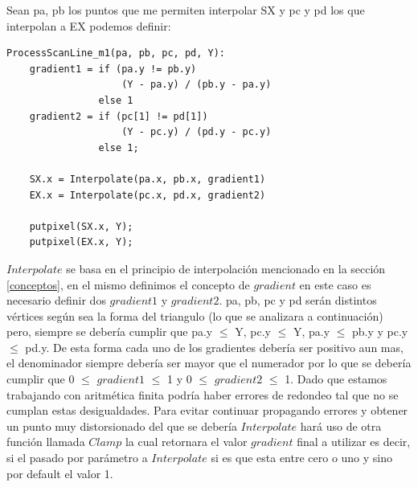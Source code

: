 \documentclass[a4paper]{article}
\begin{document}
\par Sean pa, pb los puntos que me permiten interpolar SX y pc y pd los que interpolan a EX podemos definir: 
\begin{verbatim}
ProcessScanLine_m1(pa, pb, pc, pd, Y):
    gradient1 = if (pa.y != pb.y) 
                    (Y - pa.y) / (pb.y - pa.y)
                else 1                          
    gradient2 = if (pc[1] != pd[1]) 
                    (Y - pc.y) / (pd.y - pc.y)
                else 1;
            
    SX.x = Interpolate(pa.x, pb.x, gradient1)
    EX.x = Interpolate(pc.x, pd.x, gradient2)
    
    putpixel(SX.x, Y);
    putpixel(EX.x, Y);
\end{verbatim}

$Interpolate$ se basa en el principio de interpolación mencionado en la sección \ref{conceptos}, en el mismo definimos el concepto de $gradient$ en este caso es necesario definir dos $gradient1$ y $gradient2$. pa, pb, pc y pd serán distintos vértices según sea la forma del triangulo (lo que se analizara a continuación) pero, siempre se debería cumplir que pa.y $\leq$ Y, pc.y $\leq$ Y, pa.y $\leq$ pb.y y pc.y $\leq$ pd.y. De esta forma cada uno de los gradientes debería ser positivo aun mas, el denominador siempre debería ser mayor que el numerador por lo que se debería cumplir que 0 $\leq$ $gradient1$ $\leq$ 1 y 0 $\leq$ $gradient2$ $\leq$ 1.  Dado que estamos trabajando con aritmética finita podría haber errores de redondeo tal que no se cumplan estas desigualdades. Para evitar continuar propagando errores y obtener un punto muy distorsionado del que se debería $Interpolate$ hará uso de otra función llamada $Clamp$ la cual retornara el valor $gradient$ final a utilizar es decir, si el pasado por parámetro a $Interpolate$ si es que esta entre cero o uno y sino por default el valor 1.
\end{document}
